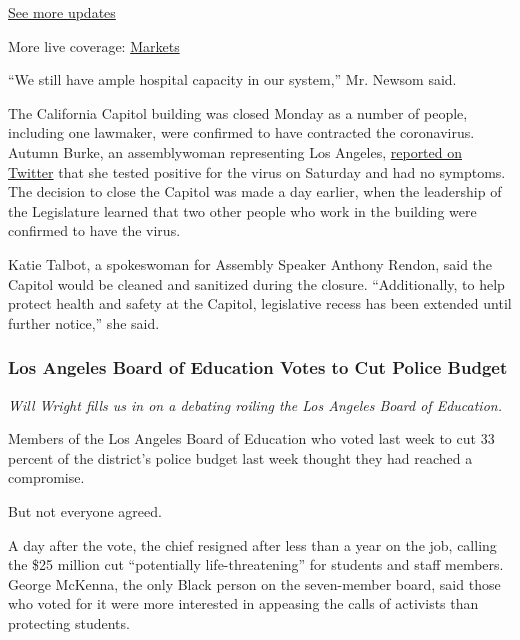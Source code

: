 \href{https://www.nytimes.com/2020/08/01/world/coronavirus-covid-19.html?action=click\&pgtype=Article\&state=default\&region=MAIN_CONTENT_1\&context=storylines_live_updates}{See
more updates}

More live coverage:
\href{https://www.nytimes.com/live/2020/07/31/business/stock-market-today-coronavirus?action=click\&pgtype=Article\&state=default\&region=MAIN_CONTENT_1\&context=storylines_live_updates}{Markets}

``We still have ample hospital capacity in our system,'' Mr. Newsom
said.

The California Capitol building was closed Monday as a number of people,
including one lawmaker, were confirmed to have contracted the
coronavirus. Autumn Burke, an assemblywoman representing Los Angeles,
\href{https://twitter.com/autumnrburke/status/1280191365976952832?s=20}{reported
on Twitter} that she tested positive for the virus on Saturday and had
no symptoms. The decision to close the Capitol was made a day earlier,
when the leadership of the Legislature learned that two other people who
work in the building were confirmed to have the virus.

Katie Talbot, a spokeswoman for Assembly Speaker Anthony Rendon, said
the Capitol would be cleaned and sanitized during the closure.
``Additionally, to help protect health and safety at the Capitol,
legislative recess has been extended until further notice,'' she said.

\hypertarget{los-angeles-board-of-education-votes-to-cut-police-budget}{%
\subsubsection{Los Angeles Board of Education Votes to Cut Police
Budget}\label{los-angeles-board-of-education-votes-to-cut-police-budget}}

\emph{Will Wright fills us in on a debating roiling the Los Angeles
Board of Education.}

Members of the Los Angeles Board of Education who voted last week to cut
33 percent of the district's police budget last week thought they had
reached a compromise.

But not everyone agreed.

A day after the vote, the chief resigned after less than a year on the
job, calling the \$25 million cut ``potentially life-threatening'' for
students and staff members. George McKenna, the only Black person on the
seven-member board, said those who voted for it were more interested in
appeasing the calls of activists than protecting students.

